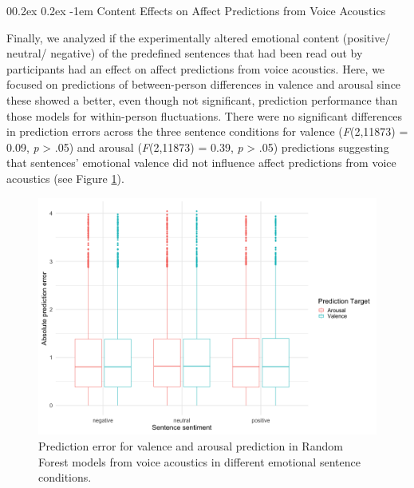 \documentclass[
  man,floatsintext]{apa6}
\makeatletter
\let\oldparagraph\paragraph
\renewcommand{\paragraph}[1]{\oldparagraph{#1}\mbox{}}
\renewcommand{\paragraph}{\@startsection{paragraph}{4}{\parindent}%
  {0\baselineskip \@plus 0.2ex \@minus 0.2ex}%
  {-1em}%
  {\normalfont\normalsize\bfseries\itshape\typesectitle}}
\makeatother
\begin{document}
\hypertarget{content-effects-on-affect-predictions-from-voice-acoustics}{%
\paragraph{Content Effects on Affect Predictions from Voice Acoustics}\label{content-effects-on-affect-predictions-from-voice-acoustics}}

Finally, we analyzed if the experimentally altered emotional content (positive/ neutral/ negative) of the predefined sentences that had been read out by participants had an effect on affect predictions from voice acoustics. Here, we focused on predictions of between-person differences in valence and arousal since these showed a better, even though not significant, prediction performance than those models for within-person fluctuations. There were no significant differences in prediction errors across the three sentence conditions for valence (\emph{F}(2,11873) = 0.09,
\emph{p} \textgreater{} .05) and arousal (\emph{F}(2,11873) = 0.39,
\emph{p} \textgreater{} .05) predictions suggesting that sentences' emotional valence did not influence affect predictions from voice acoustics (see Figure \ref{fig:gercontenteffect}).

\begin{figure}

{\centering \includegraphics[width=1\linewidth]{../figures/predictions_condition_plot} 

}

\caption[Prediction error in different emotional sentence conditions]{Prediction error for valence and arousal prediction in Random Forest models from voice acoustics in different emotional sentence conditions.}\label{fig:gercontenteffect}
\end{figure}
\end{document}
